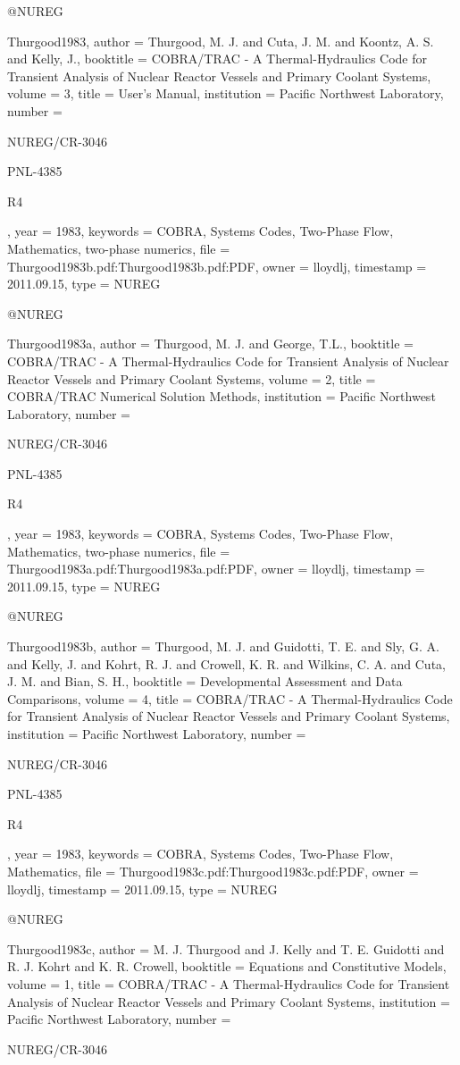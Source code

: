 {{@NUREG{Thurgood1983,
  author = {Thurgood, M. J. and Cuta, J. M. and Koontz, A. S. and Kelly, J.},
  booktitle = {COBRA/TRAC - A Thermal-Hydraulics Code for Transient Analysis of
	Nuclear Reactor Vessels and Primary Coolant Systems},
  volume = {3},
  title = {User's Manual},
  institution = {Pacific Northwest Laboratory},
  number = {NUREG/CR-3046
	
	PNL-4385
	
	R4},
  year = {1983},
  keywords = {COBRA, Systems Codes, Two-Phase Flow, Mathematics, two-phase numerics},
  file = {Thurgood1983b.pdf:Thurgood1983b.pdf:PDF},
  owner = {lloydlj},
  timestamp = {2011.09.15},
  type = {NUREG}
}

@NUREG{Thurgood1983a,
  author = {Thurgood, M. J. and George, T.L.},
  booktitle = {COBRA/TRAC - A Thermal-Hydraulics Code for Transient Analysis of
	Nuclear Reactor Vessels and Primary Coolant Systems},
  volume = {2},
  title = {COBRA/TRAC Numerical Solution Methods},
  institution = {Pacific Northwest Laboratory},
  number = {NUREG/CR-3046
	
	PNL-4385
	
	R4},
  year = {1983},
  keywords = {COBRA, Systems Codes, Two-Phase Flow, Mathematics, two-phase numerics},
  file = {Thurgood1983a.pdf:Thurgood1983a.pdf:PDF},
  owner = {lloydlj},
  timestamp = {2011.09.15},
  type = {NUREG}
}

@NUREG{Thurgood1983b,
  author = {Thurgood, M. J. and Guidotti, T. E. and Sly, G. A. and Kelly, J.
	and Kohrt, R. J. and Crowell, K. R. and Wilkins, C. A. and Cuta,
	J. M. and Bian, S. H.},
  booktitle = {Developmental Assessment and Data Comparisons},
  volume = {4},
  title = {{COBRA/TRAC} - A Thermal-Hydraulics Code for Transient Analysis of
	Nuclear Reactor Vessels and Primary Coolant Systems},
  institution = {Pacific Northwest Laboratory},
  number = {NUREG/CR-3046
	
	PNL-4385
	
	R4},
  year = {1983},
  keywords = {COBRA, Systems Codes, Two-Phase Flow, Mathematics},
  file = {Thurgood1983c.pdf:Thurgood1983c.pdf:PDF},
  owner = {lloydlj},
  timestamp = {2011.09.15},
  type = {NUREG}
}

@NUREG{Thurgood1983c,
  author = {M. J. Thurgood and J. Kelly and T. E. Guidotti and R. J. Kohrt and
	K. R. Crowell},
  booktitle = {Equations and Constitutive Models},
  volume = {1},
  title = {{COBRA/TRAC} - A Thermal-Hydraulics Code for Transient Analysis of
	Nuclear Reactor Vessels and Primary Coolant Systems},
  institution = {Pacific Northwest Laboratory},
  number = {NUREG/CR-3046
	
}}}}
